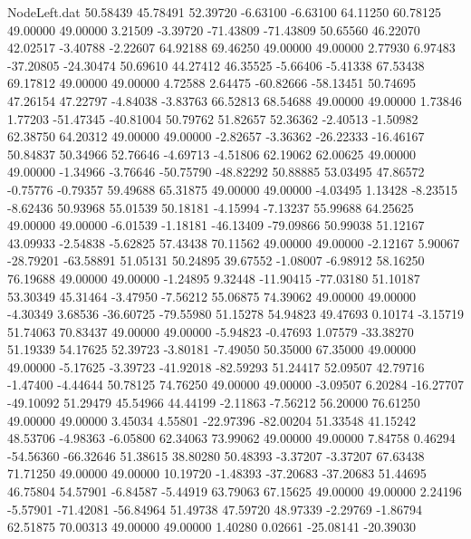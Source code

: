 \begin{filecontents}{NodeLeft.dat}
  50.58439   45.78491   52.39720    -6.63100   -6.63100   64.11250   60.78125   49.00000   49.00000    3.21509   -3.39720  -71.43809  -71.43809
  50.65560   46.22070   42.02517    -3.40788   -2.22607   64.92188   69.46250   49.00000   49.00000    2.77930    6.97483  -37.20805  -24.30474
  50.69610   44.27412   46.35525    -5.66406   -5.41338   67.53438   69.17812   49.00000   49.00000    4.72588    2.64475  -60.82666  -58.13451
  50.74695   47.26154   47.22797    -4.84038   -3.83763   66.52813   68.54688   49.00000   49.00000    1.73846    1.77203  -51.47345  -40.81004
  50.79762   51.82657   52.36362    -2.40513   -1.50982   62.38750   64.20312   49.00000   49.00000   -2.82657   -3.36362  -26.22333  -16.46167
  50.84837   50.34966   52.76646    -4.69713   -4.51806   62.19062   62.00625   49.00000   49.00000   -1.34966   -3.76646  -50.75790  -48.82292
  50.88885   53.03495   47.86572    -0.75776   -0.79357   59.49688   65.31875   49.00000   49.00000   -4.03495    1.13428   -8.23515   -8.62436
  50.93968   55.01539   50.18181    -4.15994   -7.13237   55.99688   64.25625   49.00000   49.00000   -6.01539   -1.18181  -46.13409  -79.09866
  50.99038   51.12167   43.09933    -2.54838   -5.62825   57.43438   70.11562   49.00000   49.00000   -2.12167    5.90067  -28.79201  -63.58891
  51.05131   50.24895   39.67552    -1.08007   -6.98912   58.16250   76.19688   49.00000   49.00000   -1.24895    9.32448  -11.90415  -77.03180
  51.10187   53.30349   45.31464    -3.47950   -7.56212   55.06875   74.39062   49.00000   49.00000   -4.30349    3.68536  -36.60725  -79.55980
  51.15278   54.94823   49.47693     0.10174   -3.15719   51.74063   70.83437   49.00000   49.00000   -5.94823   -0.47693    1.07579  -33.38270
  51.19339   54.17625   52.39723    -3.80181   -7.49050   50.35000   67.35000   49.00000   49.00000   -5.17625   -3.39723  -41.92018  -82.59293
  51.24417   52.09507   42.79716    -1.47400   -4.44644   50.78125   74.76250   49.00000   49.00000   -3.09507    6.20284  -16.27707  -49.10092
  51.29479   45.54966   44.44199    -2.11863   -7.56212   56.20000   76.61250   49.00000   49.00000    3.45034    4.55801  -22.97396  -82.00204
  51.33548   41.15242   48.53706    -4.98363   -6.05800   62.34063   73.99062   49.00000   49.00000    7.84758    0.46294  -54.56360  -66.32646
  51.38615   38.80280   50.48393    -3.37207   -3.37207   67.63438   71.71250   49.00000   49.00000   10.19720   -1.48393  -37.20683  -37.20683
  51.44695   46.75804   54.57901    -6.84587   -5.44919   63.79063   67.15625   49.00000   49.00000    2.24196   -5.57901  -71.42081  -56.84964
  51.49738   47.59720   48.97339    -2.29769   -1.86794   62.51875   70.00313   49.00000   49.00000    1.40280    0.02661  -25.08141  -20.39030

\end{filecontents}
